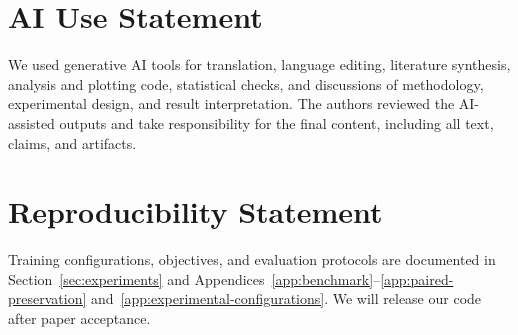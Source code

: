 \section*{AI Use Statement}
We used generative AI tools for translation, language editing, literature
synthesis, analysis and plotting code, statistical checks, and discussions
of methodology, experimental design, and result interpretation.
The authors reviewed the AI-assisted outputs and take responsibility for
the final content, including all text, claims, and artifacts.

\section*{Reproducibility Statement}
Training configurations, objectives, and evaluation protocols are documented
in Section~\ref{sec:experiments} and
Appendices~\ref{app:benchmark}--\ref{app:paired-preservation}
and~\ref{app:experimental-configurations}.
We will release our code after paper acceptance.
